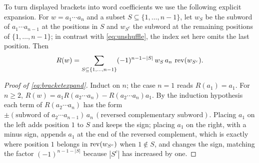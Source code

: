 To turn displayed brackets into word coefficients we use the following
explicit expansion. For $w=a_1\cdots a_n$ and a subset
$S\subseteq\{1,\ldots,n-1\}$, let $w_S$ be the subword of $a_1\cdots a_{n-1}$
at the positions in $S$ and $w_{S^c}$ the subword at the remaining positions
of $\{1,\ldots,n-1\}$; in contrast with \eqref{eq:unshuffle}, the index set
here omits the last position. Then
\begin{equation}\label{eq:bracketexpand}
 R(w)=\sum_{S\subseteq\{1,\ldots,n-1\}}(-1)^{n-1-|S|}\,w_S\,a_n\,\operatorname{rev}(w_{S^c}).
\end{equation}
\begin{proof}[Proof of \eqref{eq:bracketexpand}]
Induct on $n$; the case $n=1$ reads $R(a_1)=a_1$. For $n\geq2$,
$R(w)=a_1R(a_2\cdots a_n)-R(a_2\cdots a_n)a_1$. By the induction hypothesis
each term of $R(a_2\cdots a_n)$ has the form
$\pm(\text{subword of }a_2\cdots a_{n-1})\,a_n\,(\text{reversed complementary
subword})$. Placing $a_1$ on the left adds position $1$ to $S$ and keeps the
sign; placing $a_1$ on the right, with a minus sign, appends $a_1$ at the end
of the reversed complement, which is exactly where position $1$ belongs in
$\operatorname{rev}(w_{S^c})$ when $1\notin S$, and changes the sign, matching the factor
$(-1)^{n-1-|S|}$ because $|S^c|$ has increased by one.
\end{proof}

